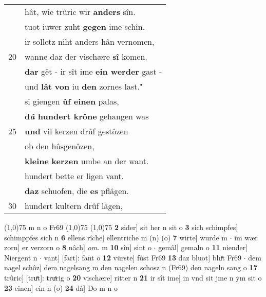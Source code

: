 \documentclass[8pt,a4paper,notitlepage]{article}
\begin{document}
\begin{table}[ht]
\begin{minipage}[t]{0.5\linewidth}
\begin{tabular}{rl}
 & hât, wie trûric wir \textbf{anders} sîn.\\ 
 & tuot iuwer zuht \textbf{gegen} ime schîn.\\ 
 & ir solletz niht anders hân vernomen,\\ 
20 & wanne daz der vischære \textbf{sî} komen.\\ 
 & \textbf{dar} gêt - ir sît ime \textbf{ein werder} gast -\\ 
 & und \textbf{lât} \textbf{von} iu \textbf{den} zornes last."\\ 
 & si giengen \textbf{ûf einen} palas,\\ 
 & \textbf{d\textit{â} hundert krône} gehangen was\\ 
25 & \textbf{und} vil kerzen drûf gestôzen\\ 
 & ob den hûsgenôzen,\\ 
 & \textbf{kleine} \textbf{kerzen} umbe an der want.\\ 
 & hundert bette er ligen vant.\\ 
 & \textbf{daz} schuofen, die \textbf{es} pflâgen.\\ 
30 & hundert kultern drûf lâgen,\\ 
\end{tabular}
\scriptsize
\line(1,0){75} \newline
m n o Fr69 \newline
\line(1,0){75} \newline
\newline
\line(1,0){75} \newline
\textbf{2} sider] sit her n sit o \textbf{3} sich schimpfes] schimppfes sich n \textbf{6} ellens rîche] ellentriche m (n) (o) \textbf{7} wirte] wurde m  $\cdot$ im wær zorn] er verzorn o \textbf{8} nâch] \textit{om.} m \textbf{10} sîn] sint o  $\cdot$ gemâl] gemaln o \textbf{11} niender] Niergent n  $\cdot$ vant] [fart]: fant o \textbf{12} vürste] fúst Fr69 \textbf{13} daz bluot] bluͦt Fr69  $\cdot$ dem nagel schôz] dem nagelsang m den nagelen schosz n (Fr69) den nageln sang o \textbf{17} trûric] [truͯt]: truͯrig o \textbf{20} vischære] ritter n \textbf{21} ir sît ime] in vnd sit jme n ẏm sit o \textbf{23} einen] ein n (o) \textbf{24} dâ] Do m n o \newline
\end{minipage}
\end{table}
\newpage
\end{document}
